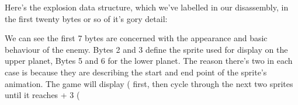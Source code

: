 Here's the explosion data structure, which we've labelled  in
our disassembly, in the first twenty bytes or so of it's gory detail:



We can see the first 7 bytes are concerned with the appearance and basic behaviour of the
enemy. Bytes 2 and 3 define the sprite used for display on the upper planet, Bytes 5 and 6
for the lower planet. The reason there's two in each case is because they are describing the
start and end point of the sprite's animation. The game will display  ( first,
then cycle through the next two sprites until it reaches  + 3 (
